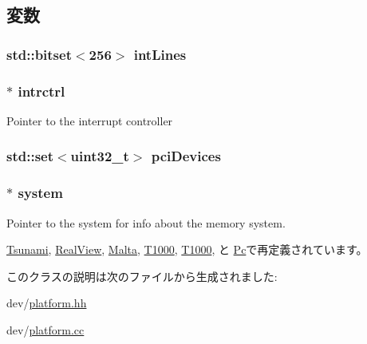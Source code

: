 \subsection{変数}
\hypertarget{classPlatform_a978f892860786a70cfc97a3cacf4b7b6}{
\subsubsection[{intLines}]{\setlength{\rightskip}{0pt plus 5cm}std::bitset$<$256$>$ {\bf intLines}}}
\label{classPlatform_a978f892860786a70cfc97a3cacf4b7b6}
\hypertarget{classPlatform_aab4191dd66c041ed67fb31d758ab705e}{
\subsubsection[{intrctrl}]{$\ast$ {\bf intrctrl}}}
\label{classPlatform_aab4191dd66c041ed67fb31d758ab705e}
Pointer to the interrupt controller \hypertarget{classPlatform_a5a95b4e20e1bfcdd134457dc41de6fd5}{
\subsubsection[{pciDevices}]{\setlength{\rightskip}{0pt plus 5cm}std::set$<${\bf uint32\_\-t}$>$ {\bf pciDevices}}}
\label{classPlatform_a5a95b4e20e1bfcdd134457dc41de6fd5}
\hypertarget{classPlatform_af27ccd765f13a4b7bd119dc7579e2746}{
\subsubsection[{system}]{$\ast$ {\bf system}}}
\label{classPlatform_af27ccd765f13a4b7bd119dc7579e2746}
Pointer to the system for info about the memory system. 

\hyperlink{classTsunami_af27ccd765f13a4b7bd119dc7579e2746}{Tsunami}, \hyperlink{classRealView_af27ccd765f13a4b7bd119dc7579e2746}{RealView}, \hyperlink{classMalta_af27ccd765f13a4b7bd119dc7579e2746}{Malta}, \hyperlink{classT1000_af27ccd765f13a4b7bd119dc7579e2746}{T1000}, \hyperlink{classT1000_1_1T1000_ab737471139f5a296e5b26e8a0e1b0744}{T1000}, と \hyperlink{classPc_af27ccd765f13a4b7bd119dc7579e2746}{Pc}で再定義されています。

このクラスの説明は次のファイルから生成されました:\begin{DoxyCompactItemize}
\item 
dev/\hyperlink{platform_8hh}{platform.hh}\item 
dev/\hyperlink{platform_8cc}{platform.cc}\end{DoxyCompactItemize}

